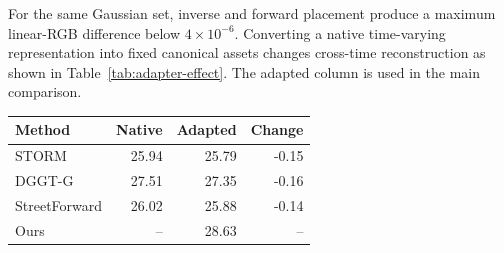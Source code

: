 \noindent\begin{minipage}[t]{0.48\textwidth}
For the same Gaussian set, inverse and forward placement produce a maximum linear-RGB difference below $4\times10^{-6}$. Converting a native time-varying representation into fixed canonical assets changes cross-time reconstruction as shown in Table~\ref{tab:adapter-effect}. The adapted column is used in the main comparison.
\end{minipage}\hfill
\begin{minipage}[t]{0.48\textwidth}
\captionsetup{type=table}
\centering\small
\caption{Effect of conversion to fixed canonical assets. PSNR is in dB.}
\label{tab:adapter-effect}
\begin{tabular}{@{}lrrr@{}}
\toprule
Method & Native & Adapted & Change \\
\midrule
STORM & 25.94 & 25.79 & -0.15 \\
DGGT-G & 27.51 & 27.35 & -0.16 \\
StreetForward & 26.02 & 25.88 & -0.14 \\
Ours & -- & 28.63 & -- \\
\bottomrule
\end{tabular}
\end{minipage}
\par\medskip

